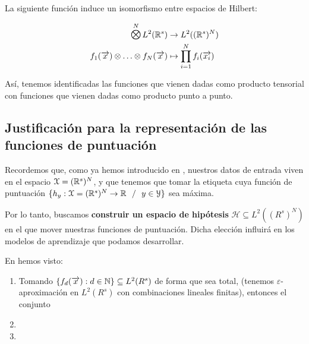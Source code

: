 \begin{teorema}
    La siguiente función induce un isomorfismo entre espacios de Hilbert:

    \begin{equation}
    \begin{split}
        \MediumOtimes^{N} L^2(\R^s) &\to L^2((\R^s)^N) \\
        f_1(\nv{x}) \otimes \ldots \otimes f_N(\nv{x}) &\mapsto \prod_{i = 1}^N f_i(\nv{x_i})
    \end{split}
    \end{equation}

    Así, tenemos identificadas las funciones que vienen dadas como producto tensorial con funciones que vienen dadas como producto punto a punto.
\end{teorema}


\subsection{Justificación para la representación de las funciones de puntuación} \label{sec:justificacion_func_repr}

Recordemos que, como ya hemos introducido en , nuestros datos de entrada viven en el espacio $\mathcal{X} = (\mathbb{R}^s)^N$, y que tenemos que tomar la etiqueta cuya función de puntuación $\{h_y: \mathcal{X} = (\mathbb{R}^s)^N \to \mathbb{R} \ \  / \ \  y \in \mathcal{Y} \}$ sea máxima.

Por lo tanto, buscamos \textbf{construir un espacio de hipótesis} $\mathcal{H} \subseteq L^2((R^s)^N)$ en el que mover nuestras funciones de puntuación. Dicha elección influirá en los modelos de aprendizaje que podamos desarrollar.

En  hemos visto:

\begin{enumerate}
    \item Tomando $\{f_d(\overrightarrow{x}): d \in \mathbb{N}\} \subseteq L^2(R^s)$ de forma que sea total, (tenemos $\varepsilon$-aproximación en $L^2(R^s)$ con combinaciones lineales finitas), entonces el conjunto
    \item
    \item
\end{enumerate}



